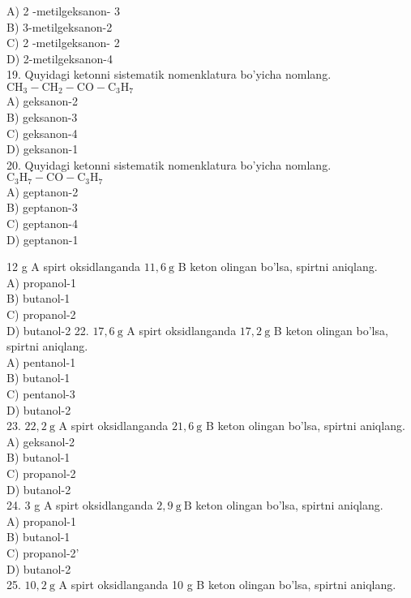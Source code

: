 A) 2 -metilgeksanon- 3\\
B) 3-metilgeksanon-2\\
C) 2 -metilgeksanon- 2\\
D) 2-metilgeksanon-4\\
19. Quyidagi ketonni sistematik nomenklatura bo'yicha nomlang.\\
$\mathrm{CH}_{3}-\mathrm{CH}_{2}-\mathrm{CO}-\mathrm{C}_{3} \mathrm{H}_{7}$\\
A) geksanon-2\\
B) geksanon-3\\
C) geksanon-4\\
D) geksanon-1\\
20. Quyidagi ketonni sistematik nomenklatura bo'yicha nomlang. $\mathrm{C}_{3} \mathrm{H}_{7}-\mathrm{CO}-\mathrm{C}_{3} \mathrm{H}_{7}$\\
A) geptanon-2\\
B) geptanon-3\\
C) geptanon-4\\
D) geptanon-1
  \item 12 g A spirt oksidlanganda $11,6 \mathrm{~g}$ B keton olingan bo'lsa, spirtni aniqlang.\\
A) propanol-1\\
B) butanol-1\\
C) propanol-2\\
D) butanol-2
22. $17,6 \mathrm{~g}$ A spirt oksidlanganda $17,2 \mathrm{~g}$ B keton olingan bo'lsa, spirtni aniqlang.\\
A) pentanol-1\\
B) butanol-1\\
C) pentanol-3\\
D) butanol-2\\
23. $22,2 \mathrm{~g}$ A spirt oksidlanganda $21,6 \mathrm{~g}$ B keton olingan bo'lsa, spirtni aniqlang.\\
A) geksanol-2\\
B) butanol-1\\
C) propanol-2\\
D) butanol-2\\
24. 3 g A spirt oksidlanganda $2,9 \mathrm{~g} \mathrm{~B}$ keton olingan bo'lsa, spirtni aniqlang.\\
A) propanol-1\\
B) butanol-1\\
C) propanol-2'\\
D) butanol-2\\
25. $10,2 \mathrm{~g}$ A spirt oksidlanganda 10 g B keton olingan bo'lsa, spirtni aniqlang.\\
